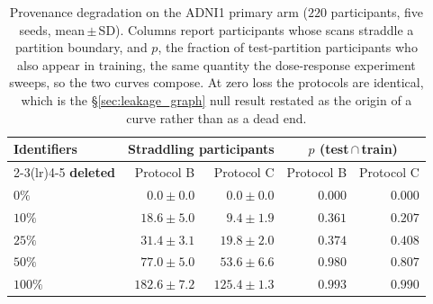 \documentclass[pdflatex,sn-vancouver-num]{sn-jnl}
\begin{document}
\begin{table}[!tb]
\centering
\small
\caption{Provenance degradation on the ADNI1 primary arm ($220$
participants, five seeds, mean\,$\pm$\,SD). Columns report participants
whose scans straddle a partition boundary, and $p$, the fraction of
test-partition participants who also appear in training, the same quantity the dose-response experiment sweeps, so the two curves compose.
At zero loss the protocols are identical, which is the
\S\ref{sec:leakage_graph} null result restated as the origin of a curve
rather than as a dead end.}
\label{tab:provenance_degradation}
\begin{tabular}{@{}lrrrr@{}}
\toprule
\textbf{Identifiers} & \multicolumn{2}{c}{\textbf{Straddling participants}}
                     & \multicolumn{2}{c}{\textbf{$p$ (test\,$\cap$\,train)}} \\
\cmidrule(lr){2-3}\cmidrule(lr){4-5}
\textbf{deleted} & Protocol B & Protocol C & Protocol B & Protocol C \\
\midrule
$0\%$   & $0.0 \pm 0.0$   & $0.0 \pm 0.0$   & $0.000$ & $0.000$ \\
$10\%$  & $18.6 \pm 5.0$  & $9.4 \pm 1.9$   & $0.361$ & $0.207$ \\
$25\%$  & $31.4 \pm 3.1$  & $19.8 \pm 2.0$  & $0.374$ & $0.408$ \\
$50\%$  & $77.0 \pm 5.0$  & $53.6 \pm 6.6$  & $0.980$ & $0.807$ \\
$100\%$ & $182.6 \pm 7.2$ & $125.4 \pm 1.3$ & $0.993$ & $0.990$ \\
\bottomrule
\end{tabular}
\end{table}
\end{document}
